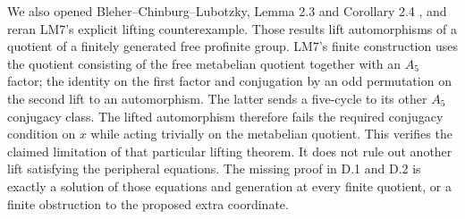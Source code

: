 We also opened Bleher--Chinburg--Lubotzky, Lemma 2.3 and Corollary 2.4
\cite{DE_BCL2020}, and reran LM7's explicit lifting counterexample.
Those results lift automorphisms of a quotient of a finitely generated
free profinite group. LM7's finite construction uses the quotient
consisting of the free metabelian quotient together with an $A_5$
factor; the identity on the first factor and conjugation by an odd
permutation on the second lift to an automorphism. The latter sends a
five-cycle to its other $A_5$ conjugacy class. The lifted automorphism
therefore fails the required conjugacy condition on $x$ while acting
trivially on the metabelian quotient. This verifies the claimed
limitation of that particular lifting theorem. It does not rule out
another lift satisfying the peripheral equations. The missing proof
in D.1 and D.2 is exactly a solution of those equations and generation
at every finite quotient, or a finite obstruction to the proposed
extra coordinate.


